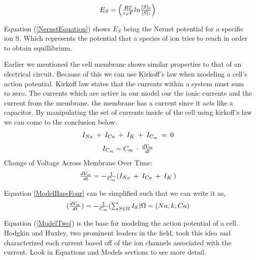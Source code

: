 \documentclass{bmcart}%
\begin{document}
\begin{equation}
\\
$$
 E_S = \left (\frac{R T}{z_S F} l n \frac {[S]_0}{[S]_i} \right)
$$
\label{NernstEquation}
\end{equation}

Equation (\ref{NernstEquation}) shows \begin{math} E_S \end{math} being the Nernst potential for a specific ion S. Which represents the potential that a species of ion tries to reach in order to obtain equillibrium\cite{Besse2011}.

 Earlier we mentioned the cell membrane shows similar properties to that of an electrical circuit. Because of this we can use Kirkoff's law when modeling a cell's action potential. Kirkoff law states that the currents within a system must sum to zero. The currents which are active in our model our the ionic currents and the current from the membrane. the membrane has a current since it acts like a capacitor. By manipulating the set of currents inside of the cell using kirkoff's law we can come to the conclusion below.
\begin{equation}
\\
$$
I_{Na} \: + \: I_{Ca} \: + \: I_K \: + \: I_{C_m} \: = \: 0
$$
\label{ModelBase}
\end{equation}
\begin{equation}
          \\
   $$
 I_{C_m}  = C_m \: \cdot \: \frac {d V_m}{d t} 
    $$          
    \end{equation}
    Change of Voltage Across Membrane Over Time:
    \begin{equation}
      \\
    $$
  \frac {d V_m}{d t} \color{black} = - \frac {1}{C_m}(I_{Na} \: + \: I_{Ca} \: + \: I_K \:)
$$
\label{ModelBaseFour}
    \end{equation}
    
Equation \ref{ModelBaseFour} can be simplified such that we can write it as,
\begin{equation}
\\
$$
 (\frac {d V_m}{d t}) = - \frac {1}{C_m}(\sum \nolimits_{S \in \Omega} I_S ) 
$$
\\
$$
 \Omega = (Na, k, Ca)
$$
\label{ModelTwo}
\end{equation}

Equation (\ref{ModelTwo}) is the base for modeling the action potential of a cell. Hodgkin and Huxley, two prominent leaders in the field, took this idea and characterized each current based off of the ion channels associated with the current. Look in Equations and Models sections to see more detail.
\end{document}
